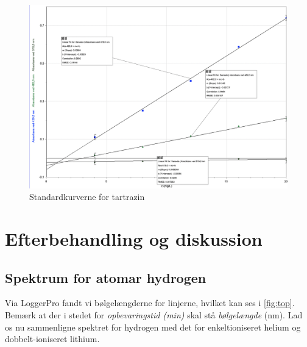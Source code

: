 \documentclass[11pt]{article}
\theoremstyle{definition}
\begin{document}
\begin{figure}[H]
\begin{center}
  \includegraphics[width=\textwidth]{stand_kurve.png}
\end{center}
\caption{Standardkurverne for tartrazin}
\label{fig:stand_kurve}
\end{figure}

\section{Efterbehandling og diskussion}
\subsection{Spektrum for atomar hydrogen}
Via LoggerPro fandt vi bølgelængderne for linjerne, hvilket kan ses i \cref{fig:top}.
Bemærk at der i stedet for \textit{opbevaringstid (min)} skal stå \textit{bølgelængde }(\unit{nm}).
Lad os nu sammenligne spektret for hydrogen med det for enkeltioniseret helium og dobbelt-ioniseret lithium.
\end{document}
